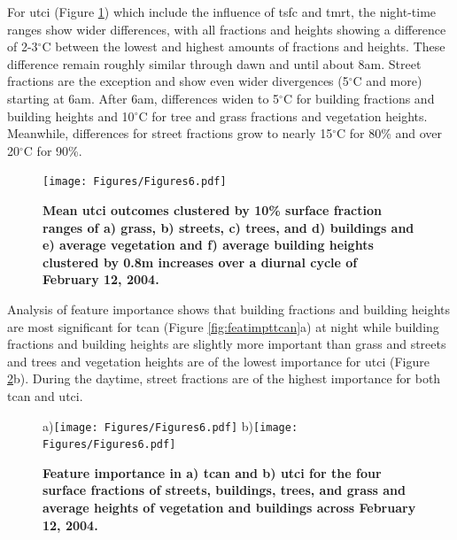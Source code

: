 \documentclass[final,3p,times,authoryear]{elsarticle}
\begin{document}
For \gls{utci} (Figure \ref{fig:utciday}) which include the influence of \gls{tsfc} and \gls{tmrt}, the night-time ranges show wider differences, with all fractions and heights showing a difference of 2-3$^{\circ}$C between the lowest and highest amounts of fractions and heights. These difference remain roughly similar through dawn and until about 8am. Street fractions are the exception and show even wider divergences (5$^{\circ}$C and more) starting at 6am. After 6am, differences widen to 5$^{\circ}$C for building fractions and building heights and 10$^{\circ}$C for tree and grass fractions and vegetation heights. Meanwhile, differences for street fractions grow to nearly 15$^{\circ}$C for 80\% and over 20$^{\circ}$C for 90\%.








\begin{figure}
\centering
\texttt{[image: Figures/Figures6.pdf]}
\caption{\bf Mean \gls{utci} outcomes clustered by 10\% surface fraction ranges of a) grass, b) streets, c) trees, and d) buildings and e) average vegetation and f) average building heights clustered by 0.8m increases over a diurnal cycle of February 12, 2004. }
 \label{fig:utciday}
\end{figure}


Analysis of feature importance shows that building fractions and building heights are most significant for \gls{tcan} (Figure \ref{fig:featimpttcan}a) at night while building fractions and building heights are slightly more important than grass and streets and trees and vegetation heights are of the lowest importance for \gls{utci} (Figure  \ref{fig:featimptutci}b). During the daytime, street fractions are of the highest importance for both \gls{tcan} and \gls{utci}.


\begin{figure}
\centering
{\tiny a)}\texttt{[image: Figures/Figures6.pdf]}
{\tiny b)}\texttt{[image: Figures/Figures6.pdf]}\\
\caption{\bf Feature importance in a) \gls{tcan} and b) \gls{utci} for the four surface fractions of streets, buildings, trees, and grass and average heights of vegetation and buildings across February 12, 2004.}
\label{fig:featimpttcan}
\label{fig:featimptutci}
\end{figure}
\end{document}
